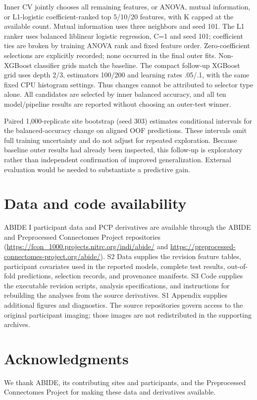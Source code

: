\documentclass[10pt,letterpaper]{article}
\begin{document}
Inner CV jointly chooses all remaining features, or ANOVA, mutual information,
or L1-logistic coefficient-ranked top 5/10/20 features, with K capped at the
available count. Mutual information uses three neighbors and seed 101. The L1
ranker uses balanced liblinear logistic regression, C=1 and seed 101; coefficient
ties are broken by training ANOVA rank and fixed feature order. Zero-coefficient
selections are explicitly recorded; none occurred in the final outer fits.
Non-XGBoost classifier grids match the baseline. The compact follow-up XGBoost
grid uses depth 2/3, estimators 100/200 and learning rates .05/.1, with the same
fixed CPU histogram settings. Thus changes cannot be attributed to selector type
alone. All candidates are selected by inner balanced accuracy, and all ten
model/pipeline results are reported without choosing an outer-test winner.

Paired 1,000-replicate site bootstrap (seed 303) estimates conditional intervals
for the balanced-accuracy change on aligned OOF predictions. These intervals
omit full training uncertainty and do not adjust for repeated exploration.
Because baseline outer results had already been inspected, this follow-up is
exploratory rather than independent confirmation of improved generalization.
External evaluation would be needed to substantiate a predictive gain.


\section*{Data and code availability}
ABIDE I participant data and PCP derivatives are available through the ABIDE and
Preprocessed Connectomes Project repositories
(\url{https://fcon_1000.projects.nitrc.org/indi/abide/} and
\url{https://preprocessed-connectomes-project.org/abide/}).
S2 Data supplies the revision feature tables, participant covariates used in the
reported models, complete test results, out-of-fold predictions, selection records,
and provenance manifests. S3 Code supplies the executable revision scripts,
analysis specifications, and instructions for rebuilding the analyses from the
source derivatives. S1 Appendix supplies additional figures and diagnostics.
The source repositories govern access to the original participant imaging;
those images are not redistributed in the supporting archives.

\section*{Acknowledgments}
We thank ABIDE, its contributing sites and participants, and the Preprocessed
Connectomes Project for making these data and derivatives available.
\end{document}
